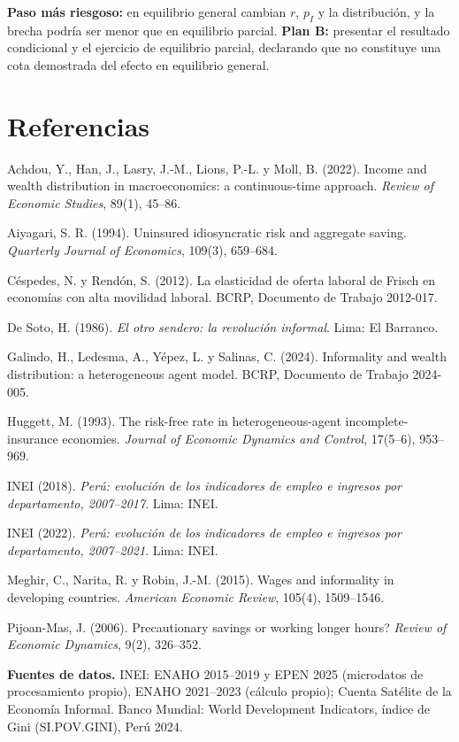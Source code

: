 \documentclass[11pt]{article}
\begin{document}
\textbf{Paso más riesgoso:} en equilibrio general cambian $r$, $p_I$ y la distribución, y la brecha podría ser menor que en equilibrio parcial.
\textbf{Plan B:} presentar el resultado condicional y el ejercicio de equilibrio parcial, declarando que no constituye una cota demostrada del efecto en equilibrio general.

\footnotesize
\section*{Referencias}
\setlength{\parskip}{1pt}
Achdou, Y., Han, J., Lasry, J.-M., Lions, P.-L. y Moll, B. (2022). Income and wealth distribution in macroeconomics: a continuous-time approach. \emph{Review of Economic Studies}, 89(1), 45--86.\par
Aiyagari, S. R. (1994). Uninsured idiosyncratic risk and aggregate saving. \emph{Quarterly Journal of Economics}, 109(3), 659--684.\par
Céspedes, N. y Rendón, S. (2012). La elasticidad de oferta laboral de Frisch en economías con alta movilidad laboral. BCRP, Documento de Trabajo 2012-017.\par
De Soto, H. (1986). \emph{El otro sendero: la revolución informal}. Lima: El Barranco.\par
Galindo, H., Ledesma, A., Yépez, L. y Salinas, C. (2024). Informality and wealth distribution: a heterogeneous agent model. BCRP, Documento de Trabajo 2024-005.\par
Huggett, M. (1993). The risk-free rate in heterogeneous-agent incomplete-insurance economies. \emph{Journal of Economic Dynamics and Control}, 17(5--6), 953--969.\par
INEI (2018). \emph{Perú: evolución de los indicadores de empleo e ingresos por departamento, 2007--2017}. Lima: INEI.\par
INEI (2022). \emph{Perú: evolución de los indicadores de empleo e ingresos por departamento, 2007--2021}. Lima: INEI.\par
Meghir, C., Narita, R. y Robin, J.-M. (2015). Wages and informality in developing countries. \emph{American Economic Review}, 105(4), 1509--1546.\par
Pijoan-Mas, J. (2006). Precautionary savings or working longer hours? \emph{Review of Economic Dynamics}, 9(2), 326--352.\par
\textbf{Fuentes de datos.} INEI: ENAHO 2015--2019 y EPEN 2025 (microdatos de procesamiento propio), ENAHO 2021--2023 (cálculo propio); Cuenta Satélite de la Economía Informal.
Banco Mundial: World Development Indicators, índice de Gini (SI.POV.GINI), Perú 2024.\par
\end{document}
